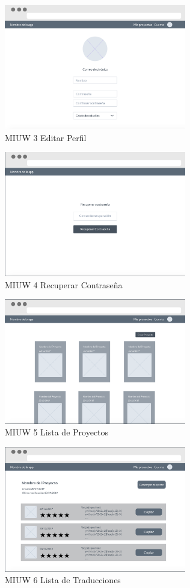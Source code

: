 \begin{figure}[H]
    \centering
    \includegraphics[width=300px]{capitulo4/imagenes/web/IUW_3.png}
    \caption{MIUW 3 Editar Perfil}
    \label{fig:MIUW-3}
\end{figure}

\begin{figure}[H]
    \centering
    \includegraphics[width=300px]{capitulo4/imagenes/web/IUW_4.png}
    \caption{MIUW 4 Recuperar Contraseña}
    \label{fig:MIUW-4}
\end{figure}

\begin{figure}[H]
    \centering
    \includegraphics[width=300px]{capitulo4/imagenes/web/IUW_5.png}
    \caption{MIUW 5 Lista de Proyectos}
    \label{fig:MIUW-5}
\end{figure}

\begin{figure}[H]
    \centering
    \includegraphics[width=300px]{capitulo4/imagenes/web/IUW_6.png}
    \caption{MIUW 6 Lista de Traducciones}
    \label{fig:MIUW-6}
\end{figure}

